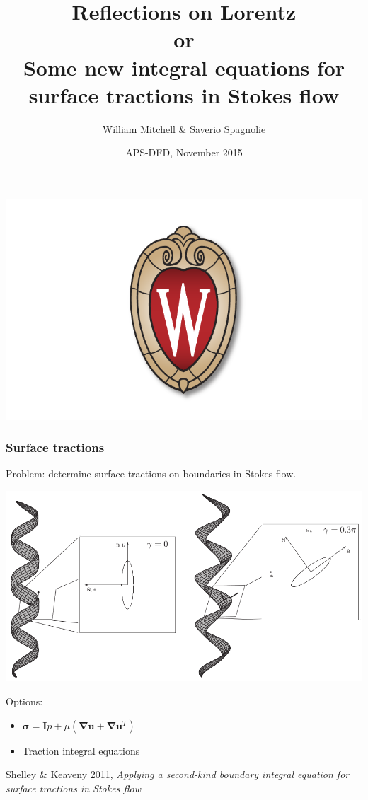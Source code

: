 \documentclass{beamer}
\title{Reflections on Lorentz\\or\\Some new integral equations for surface tractions in Stokes flow}
\author{William Mitchell \& Saverio Spagnolie}
\institute{Mathematics\\ University of Wisconsin - Madison}
\date{APS-DFD, November 2015}
\newcommand{\bm}{\boldsymbol}
\begin{document}
 \begin{frame}
\vspace{-0.3in}\titlepage
\vspace{-0.45in}\begin{center} \includegraphics[width=0.4\linewidth]{uwcrest.pdf}\end{center}
\end{frame}

\begin{frame}
\frametitle{Surface tractions}
Problem: determine surface tractions on boundaries in Stokes flow.
\begin{center}
\begin{minipage}{0.5\linewidth}
\includegraphics[width = \linewidth]{Spirals.png}
\\
\end{minipage}
\end{center}
Options:
\begin{itemize}
 \item $\bm \sigma = \bm I p + \mu (\bm\nabla\bm u + \bm \nabla \bm u ^T)$
 \item Traction integral equations
\end{itemize}
{\footnotesize Shelley \& Keaveny 2011, \emph{Applying a second-kind boundary integral equation
for surface tractions in Stokes flow}}
\end{frame}
\end{document}
